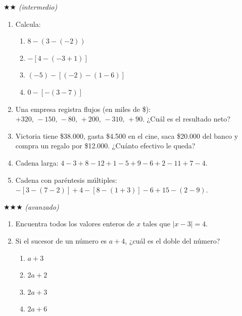 \documentclass[11pt, letterpaper]{article}
\begin{document}
$\bigstar\bigstar$ \textit{(intermedio)}

\begin{enumerate}[label=\textbf{\arabic*.}, leftmargin=*, resume]
  \item Calcula:
  \begin{multicols}{2}
  \begin{enumerate}[label=\alph*)]
    \item $8-(3-(-2))$
    \item $-[4-(-3+1)]$
    \item $(-5)-[(-2)-(1-6)]$
    \item $0-[-(3-7)]$
  \end{enumerate}
  \end{multicols}

  \item Una empresa registra flujos (en miles de \$): $+320,\,-150,\,-80,\,+200,\,-310,\,+90$. ¿Cu\'al es el resultado neto?
  \vspace{2.5cm}

  \item Victoria tiene \$38.000, gasta \$4.500 en el cine, saca \$20.000 del banco y compra un regalo por \$12.000. ¿Cu\'anto efectivo le queda?
  \vspace{2cm}

  \item Cadena larga: $4-3+8-12+1-5+9-6+2-11+7-4$.
  \vspace{2cm}

  \item Cadena con par\'entesis m\'ultiples: $-[3-(7-2)]+4-[8-(1+3)]-6+15-(2-9)$.
  \vspace{2.5cm}
\end{enumerate}

$\bigstar\bigstar\bigstar$ \textit{(avanzado)}

\begin{enumerate}[label=\textbf{\arabic*.}, leftmargin=*, resume]
  \item Encuentra todos los valores enteros de $x$ tales que $|x-3|=4$.
  \vspace{2.5cm}

  \item Si el sucesor de un n\'umero es $a+4$, ¿cu\'al es el doble del n\'umero?
  \begin{enumerate}[label=\Alph*), leftmargin=2cm, itemsep=2pt]
    \item $a+3$
    \item $2a+2$
    \item $2a+3$
    \item $2a+6$
  \end{enumerate}
  \vspace{2.5cm}
\end{enumerate}
\end{document}
